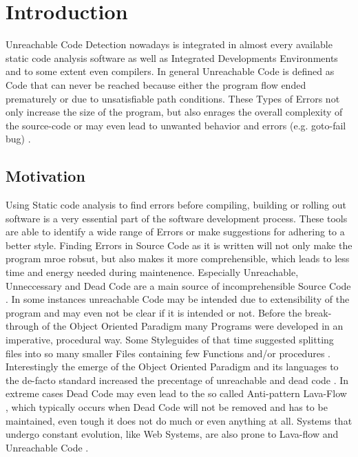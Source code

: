 \chapter{Introduction}
\label{cha:introduction}

Unreachable Code Detection nowadays is integrated in almost every available static code analysis software as well as Integrated Developments Environments and to some extent even compilers.
In general Unreachable Code is defined as Code that can never be reached because either the program flow ended prematurely or due to unsatisfiable path conditions.
These Types of Errors not only increase the size of the program, but also enrages the overall complexity of the source-code or may even lead to unwanted behavior and errors (e.g. goto-fail bug) \cite{Boyes_2014}.

\section{Motivation}
Using Static code analysis to find errors before compiling, building or rolling out software is a very essential part of the software development process.
These tools are able to identify a wide range of Errors or make suggestions for adhering to a better style.
Finding Errors in Source Code as it is written will not only make the program mroe robsut, but also makes it more comprehensible, which leads to less time and energy needed during maintenence.
Especially Unreachable, Unneccessary and Dead Code are a main source of incomprehensible Source Code \cite{Romano_2020}.
In some instances unreachable Code may be intended due to extensibility of the program \cite{Haas_2020} and may even not be clear if it is intended or not.
Before the break-through of the Object Oriented Paradigm many Programs were developed in an imperative, procedural way. Some Styleguides of that time suggested splitting files into so many smaller Files containing few Functions and/or procedures \cite{Srivastava_1992}.
Interestingly the emerge of the Object Oriented Paradigm and its languages to the de-facto standard increased the precentage of unreachable and dead code \cite{Srivastava_1992}.
In extreme cases Dead Code may even lead to the so called Anti-pattern Lava-Flow \cite{Romano_2020}, which typically occurs when Dead Code will not be removed and has to be maintained, even tough it does not do much or even anything at all.
Systems that undergo constant evolution, like Web Systems, are also prone to Lava-flow and Unreachable Code \cite{Boomsma_2012}.

